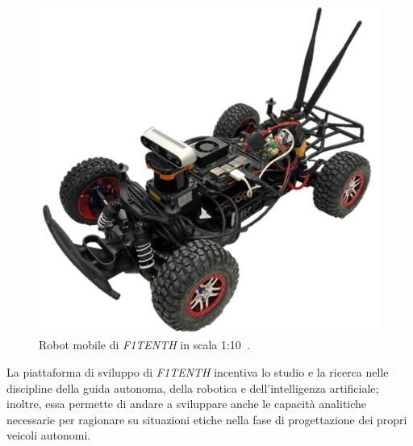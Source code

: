\begin{figure}[H]
    \centering
    \includegraphics[scale=0.1]{images/F110_car.png}
    \caption{Robot mobile di \textit{F1TENTH} in scala 1:10~\cite{f1tenth}.}
    \label{fig:fig1} %
\end{figure}

La piattaforma di sviluppo di \textit{F1TENTH} incentiva lo studio e la ricerca nelle 
discipline della guida autonoma, della robotica e dell'intelligenza artificiale; inoltre, essa 
permette di andare a sviluppare anche le capacità analitiche necessarie per ragionare su 
situazioni etiche nella fase di progettazione dei propri veicoli autonomi.

